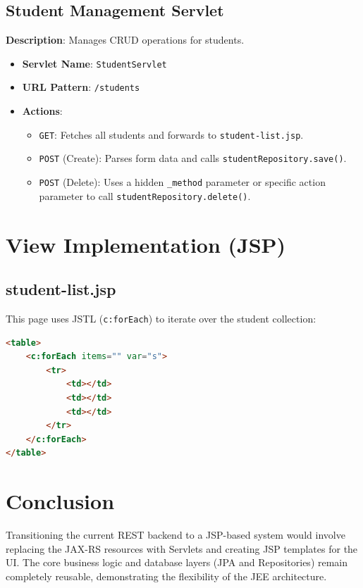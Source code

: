 \documentclass[12pt,a4paper]{article}
\begin{document}
\subsection{Student Management Servlet}
\textbf{Description}: Manages CRUD operations for students.
\begin{itemize}
    \item \textbf{Servlet Name}: \texttt{StudentServlet}
    \item \textbf{URL Pattern}: \texttt{/students}
    \item \textbf{Actions}:
    \begin{itemize}
        \item \texttt{GET}: Fetches all students and forwards to \texttt{student-list.jsp}.
        \item \texttt{POST} (Create): Parses form data and calls \texttt{studentRepository.save()}.
        \item \texttt{POST} (Delete): Uses a hidden \texttt{\_method} parameter or specific action parameter to call \texttt{studentRepository.delete()}.
    \end{itemize}
\end{itemize}

\section{View Implementation (JSP)}

\subsection{student-list.jsp}
This page uses JSTL (\texttt{c:forEach}) to iterate over the student collection:
\begin{lstlisting}[language=HTML]
<table>
    <c:forEach items="" var="s">
        <tr>
            <td></td>
            <td></td>
            <td></td>
        </tr>
    </c:forEach>
</table>
\end{lstlisting}

\section{Conclusion}
Transitioning the current REST backend to a JSP-based system would involve replacing the JAX-RS resources with Servlets and creating JSP templates for the UI. The core business logic and database layers (JPA and Repositories) remain completely reusable, demonstrating the flexibility of the JEE architecture.
\end{document}
